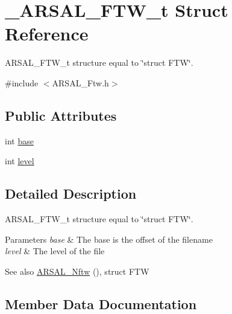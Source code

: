 \hypertarget{struct___a_r_s_a_l___f_t_w__t}{}\section{\+\_\+\+A\+R\+S\+A\+L\+\_\+\+F\+T\+W\+\_\+t Struct Reference}
\label{struct___a_r_s_a_l___f_t_w__t}


A\+R\+S\+A\+L\+\_\+\+F\+T\+W\+\_\+t structure equal to \char`\"{}struct F\+T\+W\char`\"{}.  




{\ttfamily \#include $<$A\+R\+S\+A\+L\+\_\+\+Ftw.\+h$>$}

\subsection*{Public Attributes}
\begin{DoxyCompactItemize}
\item 
int \hyperlink{struct___a_r_s_a_l___f_t_w__t_a0e6a78ca7030bbaa0e5a057381a6cc7c}{base}
\item 
int \hyperlink{struct___a_r_s_a_l___f_t_w__t_a0c7104a8384913f3cf57ed9abb1e70a6}{level}
\end{DoxyCompactItemize}


\subsection{Detailed Description}
A\+R\+S\+A\+L\+\_\+\+F\+T\+W\+\_\+t structure equal to \char`\"{}struct F\+T\+W\char`\"{}. 


\begin{DoxyParams}{Parameters}
{\em base} & The base is the offset of the filename \\
\hline
{\em level} & The level of the file \\
\hline
\end{DoxyParams}
\begin{DoxySeeAlso}{See also}
\hyperlink{_a_r_s_a_l___ftw_8h_ac655e97ab59baa526ce37336fa5d47c7}{A\+R\+S\+A\+L\+\_\+\+Nftw} (), struct F\+TW 
\end{DoxySeeAlso}


\subsection{Member Data Documentation}
